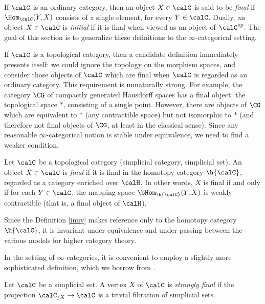 If $\calC$ is an ordinary category, then an object $X \in \calC$
is said to be {\it final} if $\Hom_{\calC}(Y,X)$ consists of a single element, for every $Y \in \calC$. Dually, an object $X \in \calC$ is {\it initial} if it is final when viewed as an object of $\calC^{op}$.
The goal of this section is to generalize these definitions to the $\infty$-categorical setting.

If $\calC$ is a topological category, then a candidate definition immediately presents itself: we could ignore the topology on the morphism spaces, and consider those objects of $\calC$ which are final when $\calC$ is regarded as an ordinary category. This requirement is unnaturally strong. For example, the category $\CG$ of compactly generated Hausdorff spaces has a final object: the topological space $\ast$, consisting of a single point. However, there are objects of $\CG$ which are equivalent to $\ast$ (any contractible space) but
not isomorphic to $\ast$ (and therefore not final objects of $\CG$, at least in the classical sense). Since any reasonable $\infty$-categorical notion is stable under equivalence, we need to find a weaker condition.

\begin{definition}\label{inuy}
Let $\calC$ be a topological category (simplicial category, simplicial set). An object $X \in \calC$ is {\it final} if it is final in the homotopy category
$\h{\calC}$, regarded as a category enriched over $\calH$. In other words, $X$ is final if and only if
for each $Y \in \calC$, the mapping space $\bHom_{ \h{\calC}}(Y,X)$ is weakly contractible
(that is, a final object of $\calH$).
\end{definition}

\begin{remark}
Since the Definition \ref{inuy} makes reference only to the homotopy category $\h{\calC}$, it is invariant under equivalence and under passing between the various models for higher category theory.
\end{remark}

In the setting of $\infty$-categories, it is convenient to employ a slightly more
sophisticated definition, which we borrow from \cite{joyalpub}.

\begin{definition}\label{strongfin}
Let $\calC$ be a simplicial set. A
vertex $X$ of $\calC$ is {\it strongly final} if the projection $\calC_{/X}
\rightarrow \calC$ is a trivial fibration of simplicial sets. 
\end{definition}

